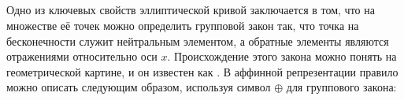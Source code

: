 \subsection{}
\label{sec:affine_group_law}
Одно из ключевых свойств эллиптической кривой заключается в том, что на множестве её точек можно определить групповой закон так, что точка на бесконечности служит нейтральным элементом, а обратные элементы являются отражениями относительно оси $x$. Происхождение этого закона можно понять на геометрической картине, и он известен как . В аффинной репрезентации  правило можно описать следующим образом, используя символ $\oplus$ для группового закона:

